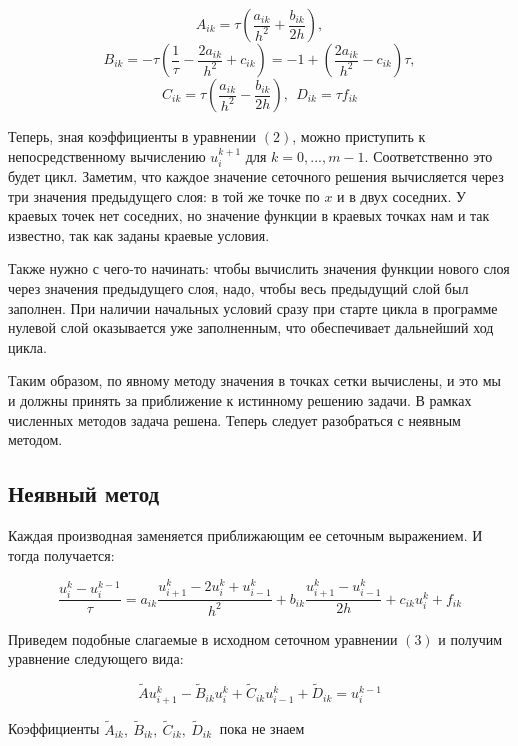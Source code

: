 \documentclass[12pt,a4paper]{article}
\begin{document}
$$
 A_{ik} = \tau \left (  \frac{a_{ik}}{h^2} + \frac{b_{ik}}{2h} \right ),
$$
$$
 B_{ik} = -\tau  \left ( \frac{1}{\tau} - \frac{2a_{ik}}{h^2} + c_{ik} \right )
 = -1 + \left ( \frac{2a_{ik}}{h^2} - c_{ik} \right ) \tau,
$$
$$
 C_{ik} = \tau \left (  \frac{a_{ik}}{h^2} - \frac{b_{ik}}{2h} \right ), \ \ 
 D_{ik} = \tau f_{ik}
$$

Теперь, зная коэффициенты в уравнении $(2)$, можно приступить к непосредственному вычислению $u_i^{k+1}$ для $k=0,...,m-1$. Соответственно это будет цикл. Заметим, что каждое значение сеточного решения вычисляется через три значения предыдущего слоя: в той же точке по $x$ и в двух соседних. У краевых точек нет соседних, но значение функции в краевых точках нам и так известно, так как заданы краевые условия.

Также нужно с чего-то начинать: чтобы вычислить значения функции нового слоя через значения предыдущего слоя, надо, чтобы весь предыдущий слой был заполнен. При наличии начальных условий сразу при старте цикла в программе нулевой слой оказывается уже заполненным, что обеспечивает дальнейший ход цикла.

Таким образом, по явному методу значения в точках сетки вычислены, и это мы и должны принять за приближение к истинному решению задачи. В рамках численных методов задача решена. Теперь следует разобраться с неявным методом.

\subsection{Неявный метод}

Каждая производная заменяется приближающим ее сеточным выражением. И тогда получается:

\begin{equation} 
 \frac{u_i^k - u_i^{k-1}}{\tau} = 
 a_{ik} \frac{u_{i+1}^k - 2u_i^k + u_{i-1}^k}{h^2} +
 b_{ik} \frac{u_{i+1}^k-u_{i-1}^k}{2h} + 
 c_{ik} u_i^k + f_{ik}
\end{equation}

Приведем подобные слагаемые в исходном сеточном уравнении $(3)$ и получим уравнение следующего вида:

\begin{equation}
 \tilde A u_{i+1}^k - \tilde B_{ik} u_i^k + \tilde C_{ik} u_{i-1}^k +
 \tilde D_{ik} = u_i^{k-1}
\end{equation}

Коэффициенты $\tilde A_{ik},\ \tilde B_{ik},\ \tilde C_{ik},\ \tilde D_{ik}\ $ пока не знаем
\end{document}

